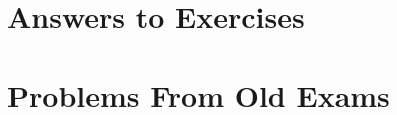 \documentclass[letterpaper, twoside]{tufte-book}
\begin{document}
\chapter{Answers to Exercises}

\chapter{Problems From Old Exams}


\end{document}
